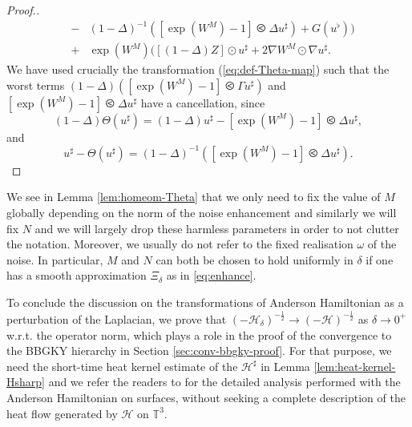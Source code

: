 \begin{proof}[Proof.]
\begin{eqnarray*}
    & - & (1 - \Delta)^{-
    1} ([\exp (W^M) - 1] \olessthan \Delta u^{\sharp}) + G (u^{\flat}))\\
    & + & \exp (W^M) ([(1 - \Delta) Z] \odot u^{\sharp} + 2 \nabla W^M \odot
    \nabla u^{\sharp}.
  \end{eqnarray*}
  We have used crucially the transformation (\ref{eq:def-Theta-map}) such that
  the worst terms $(1 - \Delta) ([\exp (W^M) - 1] \olessthan \Gamma
  u^{\sharp})$ and $[\exp (W^M) - 1] \olessthan \Delta u^{\sharp}$ have a
  cancellation, since
  \[ (1 - \Delta) \Theta (u^{\sharp}) = (1 - \Delta) u^{\sharp} - [\exp (W^M)
     - 1] \olessthan \Delta u^{\sharp}, \]
  and
  \[ u^{\sharp} - \Theta (u^{\sharp}) = (1 - \Delta)^{- 1} ([\exp (W^M) - 1]
     \olessthan \Delta u^{\sharp}) . \]
\end{proof}

\begin{nota*}
  We see in Lemma \ref{lem:homeom-Theta} that we only need to fix the value of
  $M$ globally depending on the norm of the noise enhancement and similarly we
  will fix $N$ and we will largely drop these harmless parameters in order to
  not clutter the notation. Moreover, we usually do not refer to the fixed
  realisation $\omega$ of the noise. In particular, $M$ and $N$ can both be
  chosen to hold uniformly in $\delta$ if one has a smooth approximation
  $\Xi_{\delta}$ as in \eqref{eq:enhance}.
\end{nota*}

To conclude the discussion on the transformations of
Anderson Hamiltonian as a perturbation of the Laplacian, we prove that $(-
\mathcal{H}_{\delta})^{- \frac{1}{2}} \rightarrow (- \mathcal{H})^{- \frac{1}{2}}$ as
$\delta \rightarrow 0^+$ w.r.t. the operator norm, which plays a role in the
proof of the convergence to the BBGKY hierarchy in Section
\ref{sec:conv-bbgky-proof}. For that purpose, we need the short-time heat
kernel estimate of the $\mathcal{H}^{\sharp}$ in Lemma
\ref{lem:heat-kernel-Hsharp} and we refer the readers to {\cite{BDM22}} for
the detailed analysis performed with the Anderson Hamiltonian on surfaces,
without seeking a complete description of the heat flow generated by
$\mathcal{H}$ on $\mathbb{T}^3$.


